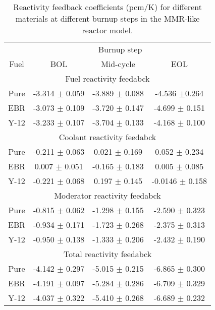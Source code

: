 \begin{table}
        \centering 
        \caption{Reactivity feedback coefficients (pcm/K) for different 
        materials at different burnup steps in the \gls{MMR}-like 
        reactor model.}
        \label{tab:coeff_mmr}
        \begin{tabular}{c c c c}
                \hline 
                & \multicolumn{3}{c}{Burnup step} \\
                Fuel & \gls{BOL} & Mid-cycle & \gls{EOL} \\
                \hline 
                \multicolumn{4}{c}{Fuel reactivity feedabck}\\
                Pure & -3.314 $\pm$ 0.059 & -3.889 $\pm$ 0.088 & -4.536 $\pm$0.264\\
                \gls{EBR} & -3.073 $\pm$ 0.109 & -3.720 $\pm$ 0.147 & -4.699 $\pm$ 0.151\\
                Y-12 & -3.233 $\pm$ 0.107 & -3.704 $\pm$ 0.133 & -4.168 $\pm$ 0.100\\
                \hline 
                \multicolumn{4}{c}{Coolant reactivity feedabck}\\
                Pure & -0.211 $\pm$ 0.063 & 0.021 $\pm$ 0.169 & 0.052 $\pm$ 0.234\\
                \gls{EBR} & 0.007 $\pm$ 0.051 & -0.165 $\pm$ 0.183 & 0.005 $\pm$ 0.085\\
                Y-12 & -0.221 $\pm$ 0.068 & 0.197 $\pm$ 0.145 & -0.0146 $\pm$ 0.158\\
                \hline 
                \multicolumn{4}{c}{Moderator reactivity feedabck}\\
                Pure & -0.815 $\pm$ 0.062 & -1.298 $\pm$ 0.155 & -2.590 $\pm$ 0.323\\
                \gls{EBR} &-0.934 $\pm$ 0.171 & -1.723 $\pm$ 0.268 & -2.375 $\pm$ 0.313\\
                Y-12 & -0.950 $\pm$ 0.138 & -1.333 $\pm$ 0.206 & -2.432 $\pm$ 0.190\\
                \hline 
                \multicolumn{4}{c}{Total reactivity feedabck}\\
                Pure & -4.142 $\pm$ 0.297 & -5.015 $\pm$ 0.215 & -6.865 $\pm$ 0.300\\
                \gls{EBR} & -4.191 $\pm$ 0.097 & -5.284 $\pm$ 0.286 & -6.709 $\pm$ 0.329\\
                Y-12 & -4.037 $\pm$ 0.322 & -5.410 $\pm$ 0.268 & -6.689 $\pm$ 0.232\\
                \hline 
                
                
        \end{tabular}
\end{table}

